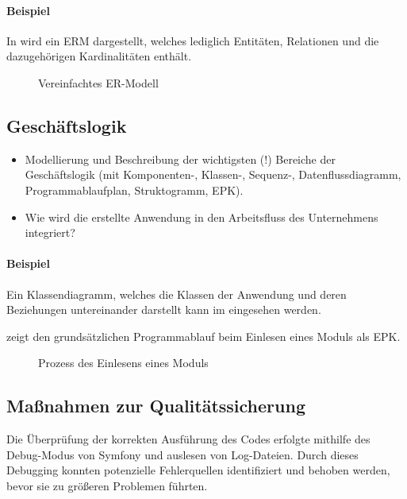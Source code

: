 \paragraph{Beispiel}
In  wird ein \ac{ERM} dargestellt, welches lediglich Entitäten, Relationen und die dazugehörigen Kardinalitäten enthält. 

\begin{figure}[htb]
\centering
{}
\caption{Vereinfachtes ER-Modell}
\label{fig:ER}
\end{figure} 


\subsection{Geschäftslogik}
\label{sec:Geschaeftslogik}

\begin{itemize}
	\item Modellierung und Beschreibung der wichtigsten (!) Bereiche der Geschäftslogik (\zB mit Kom\-po\-nen\-ten-, Klassen-, Sequenz-, Datenflussdiagramm, Programmablaufplan, Struktogramm, \ac{EPK}).
	\item Wie wird die erstellte Anwendung in den Arbeitsfluss des Unternehmens integriert?
\end{itemize}

\paragraph{Beispiel}
Ein Klassendiagramm, welches die Klassen der Anwendung und deren Beziehungen untereinander darstellt kann im  eingesehen werden.

 zeigt den grundsätzlichen Programmablauf beim Einlesen eines Moduls als \ac{EPK}.
\begin{figure}[htb]
\centering
{}
\caption{Prozess des Einlesens eines Moduls}
\label{fig:Modulimport}
\end{figure}


\subsection{Maßnahmen zur Qualitätssicherung}
\label{sec:Qualitaetssicherung}

Die Überprüfung der korrekten Ausführung des Codes erfolgte mithilfe des Debug-Modus von Symfony und auslesen von Log-Dateien. Durch dieses Debugging konnten potenzielle Fehlerquellen identifiziert und behoben werden, bevor sie zu größeren Problemen führten.

